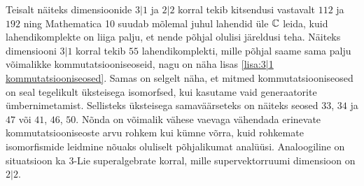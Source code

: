 Teisalt näiteks dimensioonide $3|1$ ja $2|2$ korral tekib kitsendusi vastavalt
$112$ ja $192$ ning Mathematica 10 suudab mõlemal juhul lahendid üle $\mathbb{C}$ leida,
kuid lahendikomplekte on liiga palju, et nende põhjal olulisi järeldusi teha.
Näiteks dimensiooni $3|1$ korral tekib $55$ lahendikomplekti, mille põhjal
saame sama palju võimalikke kommutatsiooniseoseid, nagu on näha lisas
\ref{lisa:3|1 kommutatsiooniseosed}. Samas on selgelt näha, et mitmed
kommutatsiooniseosed on seal tegelikult üksteisega isomorfsed, kui kasutame
vaid generaatorite ümbernimetamist. Sellisteks üksteisega samaväärseteks
on näiteks seosed $33$, $34$ ja $47$ või $41$, $46$, $50$. Nõnda on võimalik
vähese vaevaga vähendada erinevate kommutatsiooniseoste arvu rohkem kui kümne
võrra, kuid rohkemate isomorfismide leidmine nõuaks oluliselt põhjalikumat
analüüsi. Analoogiline on situatsioon ka $3$-Lie superalgebrate korral, mille
supervektorruumi dimensioon on $2|2$.
